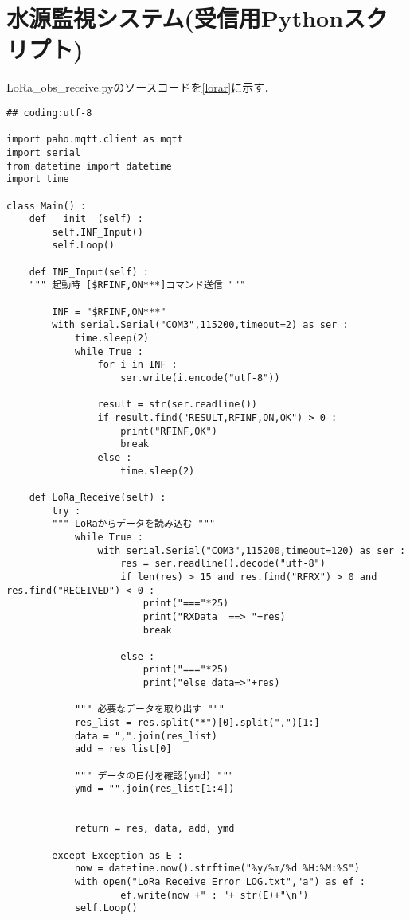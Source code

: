\section{水源監視システム(受信用Pythonスクリプト)}
\centering
LoRa\_obs\_receive.pyのソースコードを\ref{lorar}に示す．
\begin{lstlisting}[label=lorar,caption=LoRa\_obs\_raceive.py]
## coding:utf-8

import paho.mqtt.client as mqtt
import serial
from datetime import datetime
import time

class Main() :
    def __init__(self) :
        self.INF_Input()
        self.Loop()

    def INF_Input(self) :
    """ 起動時 [$RFINF,ON***]コマンド送信 """
    
        INF = "$RFINF,ON***"
        with serial.Serial("COM3",115200,timeout=2) as ser :
            time.sleep(2)
            while True :
                for i in INF :
                    ser.write(i.encode("utf-8"))

                result = str(ser.readline())
                if result.find("RESULT,RFINF,ON,OK") > 0 :
                    print("RFINF,OK")
                    break
                else :
                    time.sleep(2)

    def LoRa_Receive(self) :
        try :
        """ LoRaからデータを読み込む """
            while True :
                with serial.Serial("COM3",115200,timeout=120) as ser :
                    res = ser.readline().decode("utf-8")
                    if len(res) > 15 and res.find("RFRX") > 0 and res.find("RECEIVED") < 0 :
                        print("==="*25)
                        print("RXData  ==> "+res)
                        break
                    
                    else :
                        print("==="*25)
                        print("else_data=>"+res)
                        
            """ 必要なデータを取り出す """
            res_list = res.split("*")[0].split(",")[1:]
            data = ",".join(res_list)
            add = res_list[0]

            """ データの日付を確認(ymd) """
            ymd = "".join(res_list[1:4])


            return = res, data, add, ymd

        except Exception as E :
            now = datetime.now().strftime("%y/%m/%d %H:%M:%S")
            with open("LoRa_Receive_Error_LOG.txt","a") as ef :
                    ef.write(now +" : "+ str(E)+"\n")
            self.Loop()


\end{lstlisting}
